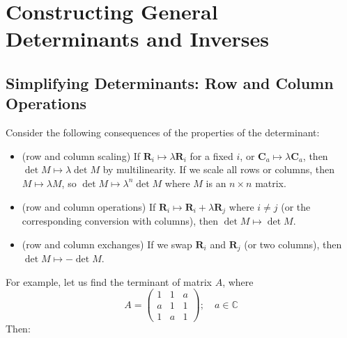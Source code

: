 \documentclass{article}
\begin{document}
	\section{Constructing General Determinants and Inverses}
	\subsection{Simplifying Determinants: Row and Column Operations}
	Consider the following consequences of the properties of the determinant:
	\begin{itemize}
		\item (row and column scaling) If $\bm R_i \mapsto \lambda \bm R_i$ for a fixed $i$, or $\bm C_a \mapsto \lambda \bm C_a$, then $\det M \mapsto \lambda \det M$ by multilinearity. If we scale all rows or columns, then $M \mapsto \lambda M$, so $\det M \mapsto \lambda^n \det M$ where $M$ is an $n \times n$ matrix.
		\item (row and column operations) If $\bm R_i \mapsto \bm R_i + \lambda \bm R_j$ where $i \neq j$ (or the corresponding conversion with columns), then $\det M \mapsto \det M$.
		\item (row and column exchanges) If we swap $\bm R_i$ and $\bm R_j$ (or two columns), then $\det M \mapsto -\det M$.
	\end{itemize}
	For example, let us find the terminant of matrix $A$, where
	\[ A = \begin{pmatrix}
		1 & 1 & a \\ a & 1 & 1 \\ 1 & a & 1
	\end{pmatrix};\quad a \in \mathbb C \]
	Then:
\end{document}
